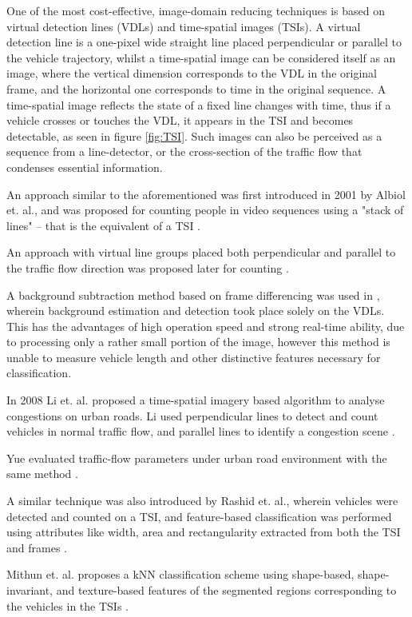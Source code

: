 One of the most cost-effective, image-domain reducing techniques is based on virtual detection lines (VDLs) and time-spatial images (TSIs).
A virtual detection line is a one-pixel wide straight line placed perpendicular or parallel to the vehicle trajectory, whilst a time-spatial image can be considered itself as an image, where the vertical dimension corresponds to the VDL in the original frame, and the horizontal one corresponds to time in the original sequence.
A time-spatial image reflects the state of a fixed line changes with time, thus if a vehicle crosses or touches the VDL, it appears in the TSI and becomes detectable, as seen in figure \ref{fig:TSI}.
Such images can also be perceived as a sequence from a line-detector, or the cross-section of the traffic flow that condenses essential information. 

An approach similar to the aforementioned was first introduced in 2001 by Albiol et. al., and was proposed for counting people in video sequences using a "stack of lines" -- that is the equivalent of a TSI \cite{Albiol2001}.

An approach with virtual line groups placed both perpendicular and parallel to the traffic flow direction was proposed later for counting \cite{Anan2006,Wu2007}.

A background subtraction method based on frame differencing was used in \cite{Anan2006, Wu2007}, wherein background estimation and detection took place solely on the VDLs.
This has the advantages of high operation speed and strong real-time ability, due to processing only a rather small portion of the image, however this method is unable to measure vehicle length and other distinctive features necessary for classification.

In 2008 Li et. al. proposed a time-spatial imagery based algorithm to analyse congestions on urban roads.
Li used perpendicular lines to detect and count vehicles in normal traffic flow, and parallel lines to identify a congestion scene \cite{Li2008}.

Yue evaluated traffic-flow parameters under urban road environment with the same method \cite{Yue2009}.

A similar technique was also introduced by Rashid et. al., wherein vehicles were detected and counted on a TSI, and feature-based classification was performed using attributes like width, area and rectangularity extracted from both the TSI and frames \cite{Rashid2010}.

Mithun et. al. proposes a kNN classification scheme using shape-based, shape-invariant, and texture-based features of the segmented regions corresponding to the vehicles in the TSIs \cite{Mithun2012a}.

